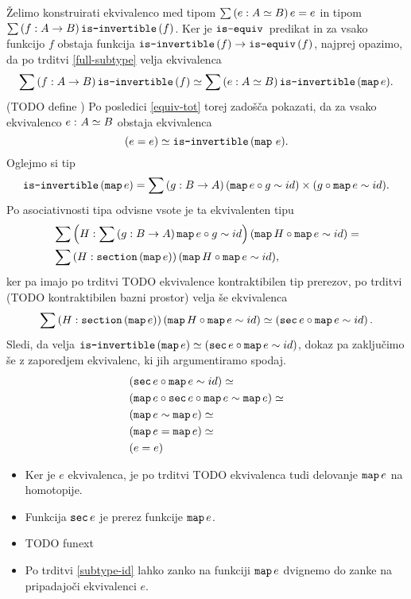 \begin{dokaz}
  Želimo konstruirati ekvivalenco med tipom \(\sumtype{e}{A \simeq B}{e = e}\) in tipom
  \(\sumtype{f}{A \to B}{\isinv(f)}\).
  Ker je \(\isequiv\) predikat in za vsako funkcijo \(f\) obstaja funkcija
  \(\typename{is-invertible}(f) \to \typename{is-equiv}(f)\), najprej opazimo, da po
  trditvi \ref{full-subtype} velja ekvivalenca
  \[\sumtype{f}{A \to B}{\isinv(f)} \simeq
    \sumtype{e}{A \simeq B}{\isinv(\map e).}
  \]
  (TODO define \map) Po posledici \ref{equiv-tot}
  torej zadošča pokazati, da za vsako ekvivalenco \(\dequiv{e}{A}{B}\) obstaja ekvivalenca
  \[(e = e) \simeq \isinv(\map \, e).\]
  Oglejmo si tip \[\isinv(\map e) = \sumtype{g}{B \to A}{(\map e \circ g \sim id) \times (g \circ \map e \sim id)}.\] Po
  asociativnosti tipa odvisne vsote je ta ekvivalenten tipu
  \begin{align*}
    & \sumtype{H}{\sumtype{g}{B \to A}{\map e \circ g \sim id}}{(\map H \circ \map e \sim id)} = \\
    & \sumtype{H}{\typename{section}(\map e)}{(\map H \circ \map e \sim id)},
  \end{align*}
  ker pa imajo po trditvi TODO ekvivalence kontraktibilen tip prerezov, po trditvi
  (TODO kontraktibilen bazni prostor) velja še ekvivalenca
  \[\sumtype{H}{\typename{section}(\map e)}{(\map H \circ \map e \sim id)} \simeq
    \left(\typename{sec} e \circ \map e \sim id\right).\]
  Sledi, da velja \(\isinv(\map e) \simeq (\typename{sec} e \circ \map e \sim id)\), dokaz pa
  zaključimo še z zaporedjem ekvivalenc, ki jih argumentiramo spodaj.
  \begin{align*}
    & (\typename{sec} e \circ \map e \sim id) \simeq \\
    & (\map e \circ \typename{sec}e \circ \map e \sim \map e) \simeq \\
    & (\map e \sim \map e) \simeq \\
    & (\map e = \map e) \simeq \\
    & (e = e)
  \end{align*}
  \begin{itemize}
  \item Ker je \(e\) ekvivalenca, je po trditvi TODO ekvivalenca tudi delovanje \(\map e\)
    na homotopije.
  \item Funkcija \(\typename{sec}e\) je prerez funkcije \(\map e\).
  \item TODO funext
  \item Po trditvi \ref{subtype-id} lahko zanko na funkciji \(\map e\) dvignemo do
    zanke na pripadajoči ekvivalenci \(e\).
  \end{itemize}
\end{dokaz}


